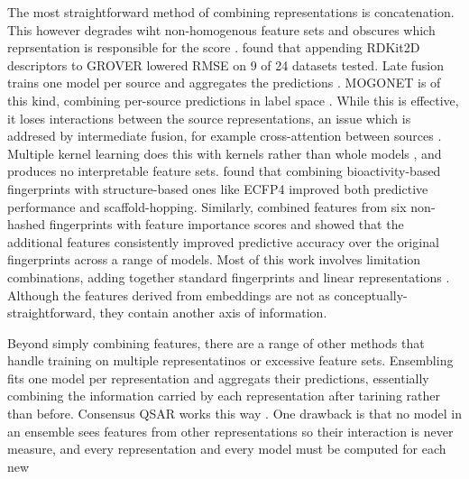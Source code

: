 The most straightforward method of combining representations is concatenation. This however degrades wiht non-homogenous feature sets and obscures which reprsentation is responsible for the score \citep{Stahlschmidt2022}. \citet{Deng2023} found that appending RDKit2D descriptors to GROVER lowered RMSE on 9 of 24 datasets tested. Late fusion trains one model per source and aggregates the predictions \citep{Steyaert2023}. MOGONET is of this kind, combining per-source predictions in label space \citep{Wang2021}. While this is effective, it loses interactions between the source representations, an issue which is addresed by intermediate fusion, for example cross-attention between sources \citep{Beaude2025}. Multiple kernel learning does this with kernels rather than whole models \citep{Gonen2011, Cichonska2018}, and produces no interpretable feature sets. \citet{Laufktter2019} found that combining bioactivity-based fingerprints with structure-based ones like ECFP4 improved both predictive performance and scaffold-hopping. Similarly, \citet{Turkina2025} combined features from six non-hashed fingerprints with feature importance scores and showed that the additional features consistently improved predictive accuracy over the original fingerprints across a range of models. Most of this work involves limitation combinations, adding together standard fingerprints and linear representations \citep{Xie2020, Laufktter2019}. Although the features derived from embeddings are not as conceptually-straightforward, they contain another axis of information. 

Beyond simply combining features, there are a range of other methods that handle training on multiple representatinos or excessive feature sets. Ensembling fits one model per representation and aggregats their predictions, essentially combining the information carried by each representation after tarining rather than before. Consensus QSAR works this way \citep{Valsecchi2020}. One drawback is that no model in an ensemble sees features from other representations so their interaction is never measure, and every representation and every model must be computed for each new 

